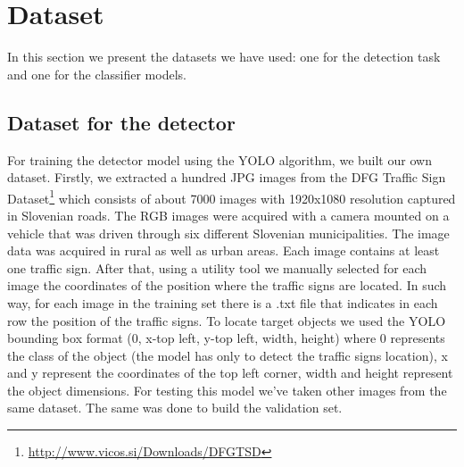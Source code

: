 \documentclass[10pt,twocolumn,letterpaper]{article}
\begin{document}
\section{Dataset}
In this section we present the datasets we have used: one for the detection task and one for the classifier models. 
\subsection{Dataset for the detector}
For training the detector model using the YOLO algorithm, we built our own dataset. Firstly, we extracted a hundred JPG images from the DFG Traffic Sign Dataset\footnote{\url{http://www.vicos.si/Downloads/DFGTSD}} which consists of about 7000 images with 1920x1080 resolution captured in Slovenian roads. The RGB images were acquired with a camera mounted on a vehicle that was driven through six different Slovenian municipalities. The image data was acquired in rural as well as urban areas. Each image contains at least one traffic sign. After that, using a utility tool we manually selected for each image the coordinates of the position where the traffic signs are located. In such way, for each image in the training set there is a .txt file that indicates in each row the position of the traffic signs. To locate target objects we used the YOLO bounding box format (0, x-top left, y-top left, width, height) where 0 represents the class of the object (the model has only to detect the traffic signs location), x and y represent the coordinates of the top left corner, width and height represent the object dimensions. For testing this model we've taken other images from the same dataset. The same was done to build the validation set.
\end{document}
